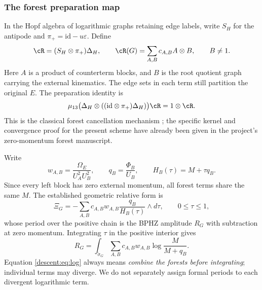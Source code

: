 \documentclass[11pt,a4paper,oneside]{article}
\theoremstyle{plain}
\theoremstyle{definition}
\theoremstyle{remark}
\numberwithin{equation}{section}
\begin{document}
\subsubsection{The forest preparation map}
In the Hopf algebra of logarithmic graphs retaining edge labels, write $S_H$ for the antipode and
$\pi_+=\mathrm{id}-u\varepsilon$. Define
\begin{equation}\label{descent:eq:prep}
 \cR=(S_H\otimes\pi_+)\Delta_H,
 \qquad \cR(G)=\sum_{A,B}c_{A,B}A\otimes B,
 \qquad B\ne1.
\end{equation}
Here $A$ is a product of counterterm blocks, and $B$ is the root quotient graph carrying the external kinematics.
The edge sets in each term still partition the original $E$.
The preparation identity is
\begin{equation}\label{descent:eq:prepidentity}
 \mu_{13}\bigl(\Delta_H\otimes((\mathrm{id}\otimes\pi_+)\Delta_H)\bigr)\cR
 =1\otimes\cR.
\end{equation}
This is the classical forest cancellation mechanism \cite{bk2011}; the specific kernel and convergence proof for the present scheme have already been given in the project's zero-momentum forest manuscript.

Write
\begin{equation}\label{descent:eq:wq}
 w_{A,B}=\frac{\Omega_E}{U_A^2U_B^2},\qquad
 q_B=\frac{\Phi_B}{U_B},\qquad H_B(\tau)=M+\tau q_B.
\end{equation}
Since every left block has zero external momentum, all forest terms share the same $M$.
The established geometric relative form is
\begin{equation}\label{descent:eq:Xi}
 \Xi_G=-\sum_{A,B}c_{A,B}w_{A,B}
                     \frac{q_B}{H_B(\tau)}\wedge d\tau,
 \qquad 0\leq\tau\leq1,
\end{equation}
whose period over the positive chain is the BPHZ amplitude $R_G$ with subtraction at zero momentum.
Integrating $\tau$ in the positive interior gives
\begin{equation}\label{descent:eq:log}
 R_G=\int_{\widetilde\sigma_G}
       \sum_{A,B}c_{A,B}w_{A,B}\log\frac{M}{M+q_B}.
\end{equation}
Equation \eqref{descent:eq:log} always means \emph{combine the forests before integrating}; individual terms may diverge.
We do not separately assign formal periods to each divergent logarithmic term.
\end{document}

